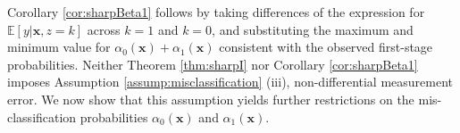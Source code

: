 Corollary \ref{cor:sharpBeta1} follows by taking differences of the expression for $\mathbb{E}[y|\mathbf{x},z=k]$ across $k=1$ and $k=0$, and substituting the maximum and minimum value for $\alpha_0(\mathbf{x}) + \alpha_1(\mathbf{x})$ consistent with the observed first-stage probabilities.
Neither Theorem \ref{thm:sharpI} nor Corollary \ref{cor:sharpBeta1} imposes Assumption \ref{assump:misclassification} (iii), non-differential measurement error.
We now show that this assumption yields further restrictions on the mis-classification probabilities $\alpha_0(\mathbf{x})$ and $\alpha_1(\mathbf{x})$.
